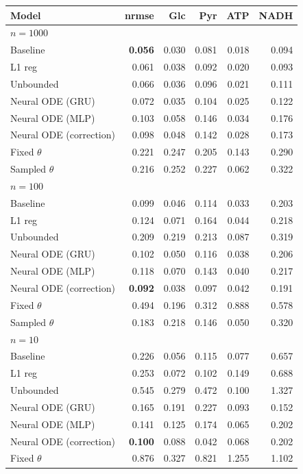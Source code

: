 \begin{tabular}{lrrrrr}
\toprule
Model & nrmse & Glc & Pyr & ATP & NADH \\
\midrule
\multicolumn{6}{l}{\textbf{$n=1000$}} \\
Baseline & \textbf{0.056} & 0.030 & 0.081 & 0.018 & 0.094 \\
L1 reg & 0.061 & 0.038 & 0.092 & 0.020 & 0.093 \\
Unbounded & 0.066 & 0.036 & 0.096 & 0.021 & 0.111 \\
Neural ODE (GRU) & 0.072 & 0.035 & 0.104 & 0.025 & 0.122 \\
Neural ODE (MLP) & 0.103 & 0.058 & 0.146 & 0.034 & 0.176 \\
Neural ODE (correction) & 0.098 & 0.048 & 0.142 & 0.028 & 0.173 \\
Fixed $\theta$ & 0.221 & 0.247 & 0.205 & 0.143 & 0.290 \\
Sampled $\theta$ & 0.216 & 0.252 & 0.227 & 0.062 & 0.322 \\
\midrule
\multicolumn{6}{l}{\textbf{$n=100$}} \\
Baseline & 0.099 & 0.046 & 0.114 & 0.033 & 0.203 \\
L1 reg & 0.124 & 0.071 & 0.164 & 0.044 & 0.218 \\
Unbounded & 0.209 & 0.219 & 0.213 & 0.087 & 0.319 \\
Neural ODE (GRU) & 0.102 & 0.050 & 0.116 & 0.038 & 0.206 \\
Neural ODE (MLP) & 0.118 & 0.070 & 0.143 & 0.040 & 0.217 \\
Neural ODE (correction) & \textbf{0.092} & 0.038 & 0.097 & 0.042 & 0.191 \\
Fixed $\theta$ & 0.494 & 0.196 & 0.312 & 0.888 & 0.578 \\
Sampled $\theta$ & 0.183 & 0.218 & 0.146 & 0.050 & 0.320 \\
\midrule
\multicolumn{6}{l}{\textbf{$n=10$}} \\
Baseline & 0.226 & 0.056 & 0.115 & 0.077 & 0.657 \\
L1 reg & 0.253 & 0.072 & 0.102 & 0.149 & 0.688 \\
Unbounded & 0.545 & 0.279 & 0.472 & 0.100 & 1.327 \\
Neural ODE (GRU) & 0.165 & 0.191 & 0.227 & 0.093 & 0.152 \\
Neural ODE (MLP) & 0.141 & 0.125 & 0.174 & 0.065 & 0.202 \\
Neural ODE (correction) & \textbf{0.100} & 0.088 & 0.042 & 0.068 & 0.202 \\
Fixed $\theta$ & 0.876 & 0.327 & 0.821 & 1.255 & 1.102 \\

\end{tabular}
